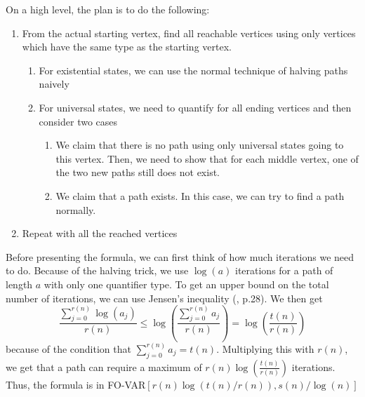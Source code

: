 On a high level, the plan is to do the following:
\begin{enumerate}
    \setlength\itemsep{0.2em}
    \item From the actual starting vertex, find all reachable vertices using only vertices which have the same type as the starting vertex.
    \begin{enumerate}
        \item For existential states, we can use the normal technique of halving paths naively
        \item For universal states, we need to quantify for all ending vertices and then consider two cases
        \begin{enumerate}
            \item We claim that there is no path using only universal states going to this vertex.
            Then, we need to show that for each middle vertex, one of the two new paths still does not exist.
            \item We claim that a path exists.
            In this case, we can try to find a path normally.
        \end{enumerate}
    \end{enumerate}
    \item Repeat with all the reached vertices
\end{enumerate}

Before presenting the formula, we can first think of how much iterations we need to do.
Because of the halving trick, we use $\log(a)$ iterations for a path of length $a$ with only one quantifier type.
To get an upper bound on the total number of iterations, we can use Jensen's inequality (\cite{inequalities-math-oly}, p.28).
We then get
\[
    \frac{\sum_{j = 0}^{r(n)}\log(a_{j})}{r(n)} \leq \log\left( \frac{\sum_{j= 0}^{r(n)}a_{j}}{r(n)} \right) = \log\left( \frac{t(n)}{r(n)} \right)
\]
because of the condition that $\sum_{j= 0}^{r(n)}a_{j} = t(n)$.
Multiplying this with $r(n)$, we get that a path can require a maximum of $r(n)\log\left( \frac{t(n)}{r(n)} \right)$ iterations.
Thus, the formula is in FO-VAR$\left[ r(n)\log\left( t(n)/r(n) \right), s(n)/\log(n) \right]$

